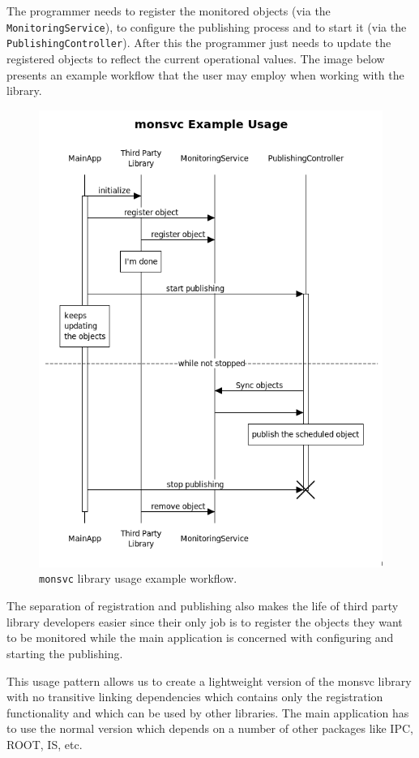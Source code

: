 The programmer needs to register the monitored objects (via the {\tt MonitoringService}), to configure the publishing process and to start it (via the {\tt PublishingController}). After this the programmer just needs to update the registered objects to reflect the current operational values. The image below presents an example workflow that the user may employ when working with the library.  

\begin{figure}[ht!]
\centering
\includegraphics[scale=0.6]{Images/workflow.png}
\caption{{\tt monsvc} library usage example workflow.}
\end{figure}

The separation of registration and publishing also makes the life of third party library developers easier since their only job is to register the objects they want to be monitored while the main application is concerned with configuring and starting the publishing.

This usage pattern allows us to  create a lightweight version of the monsvc library with no transitive linking dependencies which contains only the registration functionality and which can be used by other libraries. The main application has to use the normal version which depends on a number of other packages like IPC, ROOT, IS, etc.
